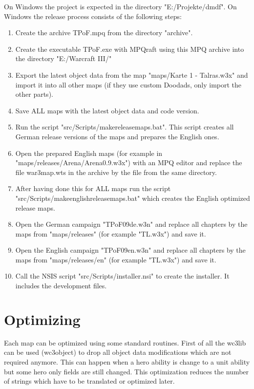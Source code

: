 \documentclass[a4paper,12pt,titlepage]{report}
\begin{document}
\vspace{\baselineskip}

On Windows the project is expected in the directory "E:/Projekte/dmdf".
On Windows the release process consists of the following steps:
\begin{enumerate}
\item Create the archive TPoF.mpq from the directory "archive".
\item Create the executable TPoF.exe with MPQraft using this MPQ archive into the directory "E:/Warcraft III/"
\item Export the latest object data from the map "maps/Karte 1 - Talras.w3x" and import it into all other maps (if they use custom Doodads, only import the other parts).
\item Save ALL maps with the latest object data and code version.
\item Run the script "src/Scripts/makereleasemaps.bat". This script creates all German release versions of the maps and prepares the English ones.
\item Open the prepared English maps (for example in "maps/releases/Arena/Arena0.9.w3x") with an MPQ editor and replace the file war3map.wts in the archive by the file from the same directory.
\item After having done this for ALL maps run the script "src/Scripts/makeenglishreleasemaps.bat" which creates the English optimized release maps.
\item Open the German campaign "TPoF09de.w3n" and replace all chapters by the maps from "maps/releases" (for example "TL.w3x") and save it.
\item Open the English campaign "TPoF09en.w3n" and replace all chapters by the maps from "maps/releases/en" (for example "TL.w3x") and save it.
\item Call the NSIS script "src/Scripts/installer.nsi" to create the installer. It includes the development files.
\end{enumerate}

\section{Optimizing}

Each map can be optimized using some standard routines. First of all the wc3lib can be used (wc3object) to drop all object data modifications which are not required anymore. This can happen when a hero ability is change to a unit ability but some hero only fields are still changed. This optimization reduces the number of strings which have to be translated or optimized later.
\end{document}
